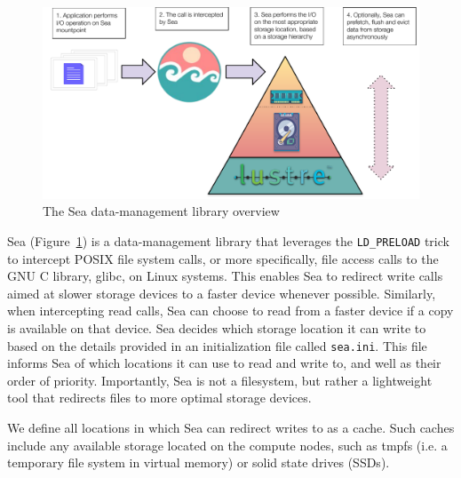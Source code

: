 \documentclass[fleqn,10pt]{wlscirep}
\begin{document}
\begin{figure}

    \centering
    \includegraphics[width=\columnwidth]{figures/sea-diagram.pdf}%
\caption{The Sea data-management library overview}
\label{fig:seaneuro:diagram}
\end{figure}
    Sea (Figure~\ref{fig:seaneuro:diagram}) is a data-management library that leverages
    the \texttt{LD\_PRELOAD}
    trick to intercept POSIX file system calls, or more specifically, file access calls to the GNU C library,
    glibc, on Linux systems. This enables Sea to redirect write calls
    aimed at slower storage devices to a faster device whenever possible.
    Similarly, when intercepting read calls, Sea can choose to read from a
    faster device if a copy is available on that device. Sea decides which
    storage location it can write to based on the details provided in an
    initialization file called \texttt{sea.ini}. This file informs Sea of which
    locations it can use to read and write to, and well as their order of
    priority. Importantly, Sea is not a filesystem, but rather a
    lightweight tool that redirects files to more optimal storage devices.

    We define all locations in which Sea can redirect writes to as a cache. Such
    caches include any available storage located on the compute nodes, such as
    tmpfs (i.e. a temporary file system in virtual memory) or solid state drives (SSDs). 
\end{document}
